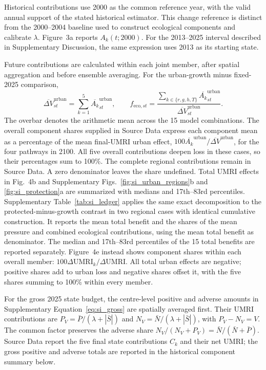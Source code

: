 Historical contributions use 2000 as the common reference year, with the valid annual support of the stated historical estimator. This change reference is distinct from the 2000--2004 baseline used to construct ecological components and calibrate $\lambda$. Figure~3a reports $A_k(t;2000)$. For the 2013--2025 interval described in Supplementary Discussion, the same expression uses 2013 as its starting state.

Future contributions are calculated within each joint member, after spatial aggregation and before ensemble averaging. For the urban-growth minus fixed-2025 comparison,
\begin{equation}\label{eq:si_decomposition}
\overline{\Delta V}^{\mathrm{urban}}_{st}=\sum_{k=1}^5\overline{A_k}^{\mathrm{urban}}_{st},\qquad
f_{\mathrm{eco},st}=\frac{\sum_{k\in\{r,g,h,T\}}\overline{A_k}^{\mathrm{urban}}_{st}}
 {\overline{\Delta V}^{\mathrm{urban}}_{st}}.
\end{equation}
The overbar denotes the arithmetic mean across the 15 model combinations. The overall component shares supplied in Source Data express each component mean as a percentage of the mean final-UMRI urban effect, $100\overline{A_k}^{\mathrm{urban}}/\overline{\Delta V}^{\mathrm{urban}}$, for the four pathways in 2100. All five overall contributions deepen loss in these cases, so their percentages sum to 100\%. The complete regional contributions remain in Source Data. A zero denominator leaves the share undefined. Total UMRI effects in Fig.~4b and Supplementary Figs.~\ref{fig:si_urban_regions}b and \ref{fig:si_protection}a are summarized with medians and 17th--83rd percentiles. Supplementary Table~\ref{tab:si_ledger} applies the same exact decomposition to the protected-minus-growth contrast in two regional cases with identical cumulative construction. It reports the mean total benefit and the shares of the mean pressure and combined ecological contributions, using the mean total benefit as denominator. The median and 17th--83rd percentiles of the 15 total benefits are reported separately. Figure~4e instead shows component shares within each overall member: $100\Delta\mathrm{UMRI}_k/\Delta\mathrm{UMRI}$. All total urban effects are negative; positive shares add to urban loss and negative shares offset it, with the five shares summing to 100\% within every member. 

For the gross 2025 state budget, the centre-level positive and adverse amounts in Supplementary Equation~\eqref{eq:si_gross} are spatially averaged first. Their UMRI contributions are $P_V=\bar P/(\lambda+|\bar S|)$ and $N_V=\bar N/(\lambda+|\bar S|)$, with $P_V-N_V=V$. The common factor preserves the adverse share $N_V/(N_V+P_V)=\bar N/(\bar N+\bar P)$. Source Data report the five final state contributions $C_k$ and their net UMRI; the gross positive and adverse totals are reported in the historical component summary below.

